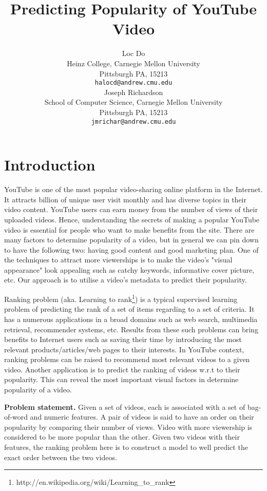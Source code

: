 \documentclass{article} %
\title{Predicting Popularity of YouTube Video}
\author{
Loc Do \\
Heinz College,
Carnegie Mellon University \\
Pittsburgh PA, 15213\\
\texttt{halocd@andrew.cmu.edu} \\
\And
Joseph Richardson \\
School of Computer Science,
Carnegie Mellon University \\
Pittsburgh PA, 15213 \\
\texttt{jmrichar@andrew.cmu.edu} \\
}
\begin{document}
\maketitle

\section{Introduction}
\label{sec:intro}
YouTube is one of the most popular video-sharing online platform in the Internet. It attracts billion of unique user visit monthly and has diverse topics in their video content. YouTube users can earn money from the number of views of their uploaded videos. Hence, understanding the secrets of making a popular YouTube video is essential for people who want to make benefits from the site. There are many factors to determine popularity of a video, but in general we can pin down to have the following two: having good content and good marketing plan. One of the techniques to attract more viewerships is to make the video's "visual appearance" look appealing such as catchy keywords, informative cover picture, etc. Our approach is to utilise a video's metadata to predict their popularity.

Ranking problem (aka. Learning to rank\footnote{http://en.wikipedia.org/wiki/Learning\_to\_rank}) is a typical supervised learning problem of predicting the rank of a set of items regarding to a set of criteria. It has a numerous applications in a broad domains such as web search, multimedia retrieval, recommender systems, etc. Results from these such problems can bring benefits to Internet users such as saving their time by introducing the most relevant products/articles/web pages to their interests. In YouTube context, ranking problems can be raised to recommend most relevant videos to a given video. Another application is to predict the ranking of videos w.r.t to their popularity. This can reveal the most important visual factors in determine popularity of a video.

\textbf{Problem statement.} Given a set of videos, each is associated with a set of bag-of-word and numeric features. A pair of videos is said to have an order on their popularity by comparing their number of views. Video with more viewership is considered to be more popular than the other. Given two videos with their features, the ranking problem here is to construct a model to well predict the exact order between the two videos.




	

		 
\end{document}

